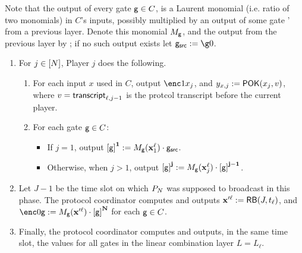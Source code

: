 \documentclass{article}
\begin{document}
Note that the output of every gate $\mathsf{g} \in C$,
is a Laurent monomial (i.e. ratio of two monomials) in $C$'s inputs,
possibly multiplied by an output of some gate \gate' from a previous layer.
Denote this monomial $M_\mathsf{g}$,
and the output from the previous layer by \gatesrc;
if no such output exists let $\gatesrc\defeq \g0$.
\\
\begin{enumerate}
 \item\label{itm:mpcpok} For $j\in [N]$, Player $j$ does the following.\\
\begin{enumerate}
 \item For each input $x$ used in $C$, output $\enc1{x_j}$, and $y_{x,j}:= \mathsf{POK}(x_j,v)$, where $v=\mathsf{transcript}_{\ell,j-1}$ is the protcol transcript before the current player.
 \item\label{itm:multiplyacc} For each gate $\mathsf{g} \in C$:
\begin{itemize}


\item If $j=1$, output ${{[\mathsf{g}]}^{\mathbf{1}}}:= M_\mathsf{g}(\mathbf{x}^\ell_1)\cdot \mathsf{g}_{\mathsf{src}}$.
\item Otherwise, when $j>1$, output ${{[\mathsf{g}]}^{\mathbf{j}}}:= M_\mathsf{g}(\mathbf{x}^\ell_j)\cdot {\ensuremath{{[\mathsf{g}]}^{\mathbf{j-1}}}}$.
\end{itemize}

\end{enumerate}
\item Let $J-1$ be the time slot on which $P_N$ was supposed to broadcast in this phase. 
The protocol coordinator computes and outputs $\mathbf{x}'^\ell:= \mathsf{\mathsf {RB}}(J,t_\ell)$,
and $\enc0{\gate}\defeq M_\gate(\inp'^\ell)\cdot \acc{\gate}{\numplayers}$ for each $\mathsf{g}\in C$.
\item Finally, the protocol coordinator computes and outputs, in the same time slot, the values  for all gates \gate 
in the linear combination layer $L=L_\ell$.
\end{enumerate}
\end{document}
